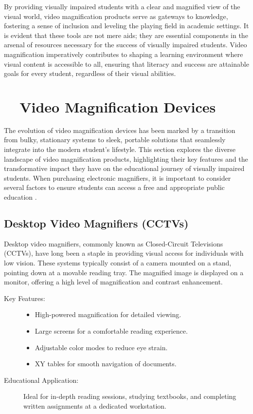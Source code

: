 By providing visually impaired students with a clear and magnified view of the visual world, video magnification products serve as gateways to knowledge, fostering a sense of inclusion and leveling the playing field in academic settings. It is evident that these tools are not mere aids; they are essential components in the arsenal of resources necessary for the success of visually impaired students. Video magnification imperatively contributes to shaping a learning environment where visual content is accessible to all, ensuring that literacy and success are attainable goals for every student, regardless of their visual abilities.\supercite{Kelly2011, Burgstahler2015}

\section{~~Video Magnification Devices}\label{ch6:sec:video-magnification-devices}
The evolution of video magnification devices has been marked by a transition from bulky, stationary systems to sleek, portable solutions that seamlessly integrate into the modern student's lifestyle. This section explores the diverse landscape of video magnification products, highlighting their key features and the transformative impact they have on the educational journey of visually impaired students. When purchasing electronic magnifiers, it is important to consider several factors to ensure students can access a free and appropriate public education \supercite{PerkinsVideoMagnifier}.

\subsection{Desktop Video Magnifiers (CCTVs)}
Desktop video magnifiers, commonly known as Closed-Circuit Televisions (CCTVs), have long been a staple in providing visual access for individuals with low vision. These systems typically consist of a camera mounted on a stand, pointing down at a movable reading tray. The magnified image is displayed on a monitor, offering a high level of magnification and contrast enhancement.\supercite{AFBMagnification}

\begin{description}
	\item[Key Features:]
	      \begin{itemize}
		      \item High-powered magnification for detailed viewing.
		      \item Large screens for a comfortable reading experience.
		      \item Adjustable color modes to reduce eye strain.
		      \item XY tables for smooth \gls{navigation} of documents.
	      \end{itemize}
	\item[Educational Application:] Ideal for in-depth reading sessions, studying textbooks, and completing written assignments at a dedicated workstation.
\end{description}


